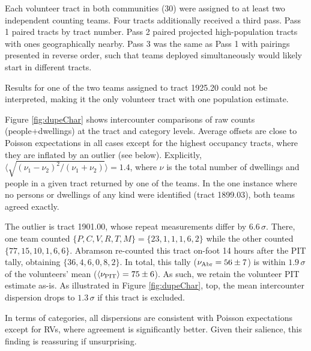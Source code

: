 \documentclass[11pt,twocolumn]{article}
\begin{document}
Each volunteer tract in both communities (30) were assigned to at least two independent counting teams.
Four tracts additionally received a third pass. Pass 1 paired tracts by tract number. Pass 2 paired projected 
high-population tracts with ones geographically nearby. Pass 3 was the same as Pass 1 with 
pairings presented in reverse order, such that teams deployed simultaneously would likely start in different 
tracts. 

Results for one of the two teams assigned to tract 1925.20 could not be interpreted, making it the only
volunteer tract with one population estimate.

Figure \ref{fig:dupeChar} shows intercounter comparisons of raw counts (people+dwellings)
at the tract and category levels. Average offsets are close to Poisson expectations in all cases 
except for the highest occupancy tracts, where they are inflated by an outlier (see below).
Explicitly, $\langle\sqrt{(\nu_{1}-\nu_{2})^{2}/(\nu_{1} + \nu_{2})}\rangle=1.4$, where
$\nu$ is the total number of dwellings and people in a given tract returned by one of the teams. 
In the one instance where no persons or dwellings of any kind were identified (tract 1899.03), 
both teams agreed exactly.

The outlier is tract 1901.00, whose repeat measurements differ by $6.6\,\sigma$. There, 
one team counted $\{P,C,V,R,T,M\}=\{23,1,1,1,6,2\}$ while the other counted $\{77,15,10,1,6,6\}$. 
Abramson re-counted this tract on-foot 14 hours after the PIT tally, obtaining $\{36, 4, 6, 0, 8, 2\}$.
In total, this tally ($\nu_{\rm Abr}=56\pm7$) is within $1.9\,\sigma$ of the volunteers' mean 
($\langle\nu_{\rm PIT}\rangle=75\pm6$). As such, we retain the volunteer PIT estimate as-is. As illustrated in 
Figure \ref{fig:dupeChar}, top, the mean intercounter dispersion drops to $1.3\,\sigma$ if this tract is 
excluded.

In terms of categories, all dispersions are consistent with Poisson expectations except for RVs, where 
agreement is significantly better. Given their salience, this finding is reassuring if unsurprising.

\end{document}
